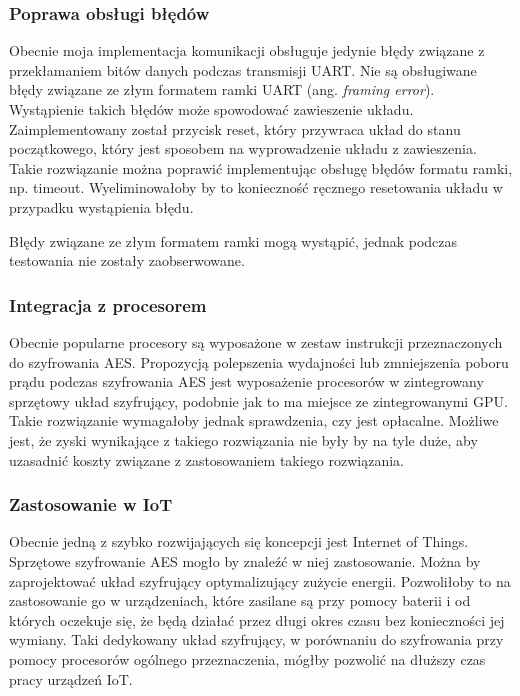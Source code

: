 \subsubsection{Poprawa obsługi błędów}
Obecnie moja implementacja komunikacji obsługuje jedynie błędy związane z przekłamaniem bitów danych podczas transmisji UART. Nie są obsługiwane błędy związane ze złym formatem ramki UART (ang. \textit{framing error}). Wystąpienie takich błędów może spowodować zawieszenie układu. Zaimplementowany został przycisk reset, który przywraca układ do stanu początkowego, który jest sposobem na wyprowadzenie układu z zawieszenia. Takie rozwiązanie można poprawić implementując obsługę błędów formatu ramki, np. timeout. Wyeliminowałoby by to konieczność ręcznego resetowania układu w przypadku wystąpienia błędu.

Błędy związane ze złym formatem ramki mogą wystąpić, jednak podczas testowania nie zostały zaobserwowane.

\subsubsection{Integracja z procesorem}
Obecnie popularne procesory są wyposażone w zestaw instrukcji przeznaczonych do szyfrowania AES. Propozycją polepszenia wydajności lub zmniejszenia poboru prądu podczas szyfrowania AES jest wyposażenie procesorów w zintegrowany sprzętowy układ szyfrujący, podobnie jak to ma miejsce ze zintegrowanymi GPU. Takie rozwiązanie wymagałoby jednak sprawdzenia, czy jest opłacalne. Możliwe jest, że zyski wynikające z takiego rozwiązania nie były by na tyle duże, aby uzasadnić koszty związane z zastosowaniem takiego rozwiązania.

\subsubsection{Zastosowanie w IoT}
Obecnie jedną z szybko rozwijających się koncepcji jest Internet of Things. Sprzętowe szyfrowanie AES mogło by znaleźć w niej zastosowanie. Można by zaprojektować układ szyfrujący optymalizujący zużycie energii. Pozwoliłoby to na zastosowanie go w urządzeniach, które zasilane są przy pomocy baterii i od których oczekuje się, że będą działać przez długi okres czasu bez konieczności jej wymiany. Taki dedykowany układ  szyfrujący, w porównaniu do szyfrowania przy pomocy procesorów ogólnego przeznaczenia, mógłby pozwolić na dłuższy czas pracy urządzeń IoT.
